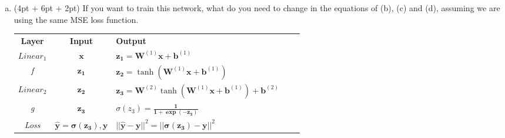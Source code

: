\documentclass{article}
\begin{document}
\begin{enumerate}[(a)]
  \item
        (4pt + 6pt + 2pt) If you want to train this network, what do you need to change in the equations of (b), (c) and (d), assuming we are using the same MSE loss function.

        \begin{tcolorbox}
          \centering
          \begin{tabular}{|c|c|l|cc}
            \cline{1-3}
            \textbf{Layer}                                    & \textbf{Input}                & \textbf{Output}                           &  & \\
            \cline{1-3}
            \textit{$Linear_1$}                               & $\bm{x}$                      &
            $\bm{z_1}=\bm{W}^{(1)}\bm{x}+\bm{b}^{(1)}$        &                               &                                                \\ \cline{1-3}
            \textit{f}                                        & $\bm{z_1}$                    &
            $\bm{z_2}=\tanh(\bm{W}^{(1)}\bm{x}+\bm{b}^{(1)})$ &                               &                                                \\
            \cline{1-3}
            \textit{$Linear_2$}                               & $\bm{z_2}$                    &
            $\bm{z_3}=\bm{W}^{(2)}\tanh(\bm{W}^{(1)}\bm{x}+\bm{b}^{(1)})+\bm{b}^{(2)}$
                                                              &                               &                                                \\ \cline{1-3}
            \textit{g}                                        & $\bm{z_3}$                    & $\sigma(z_3)=\bm{\frac{1}{1+\exp(-z_3)}}$
                                                              &                               &                                                \\ \cline{1-3}
            \textit{Loss}                                     & $\bm{\hat{y}=\sigma(z_3), y}$ &
            $||\bm{\hat{y}-y}||^2=||\bm{\sigma(z_3)}-\bm{y}||^2$
                                                              &                               &                                                \\ \cline{1-3}
          \end{tabular}
        \end{tcolorbox}


\end{enumerate}
\end{document}

